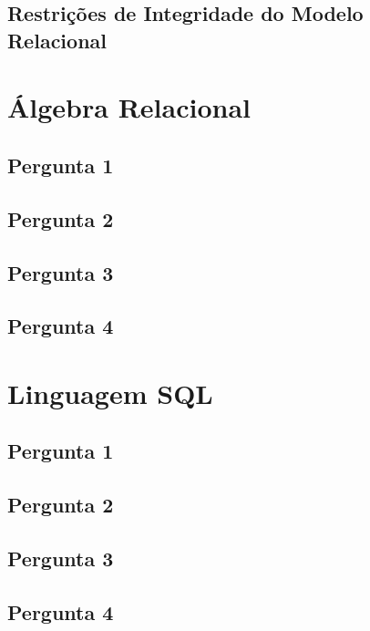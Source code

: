 \documentclass[11pt,a4paper]{article}
\begin{document}
\subsection{Restri\c{c}\~oes de Integridade do Modelo Relacional}
\section{\'{A}lgebra Relacional}
\subsection{Pergunta 1}
\subsection{Pergunta 2}
\subsection{Pergunta 3}
\subsection{Pergunta 4}

\section{Linguagem SQL}
\subsection{Pergunta 1}
\subsection{Pergunta 2}
\subsection{Pergunta 3}
\subsection{Pergunta 4}
\end{document}
